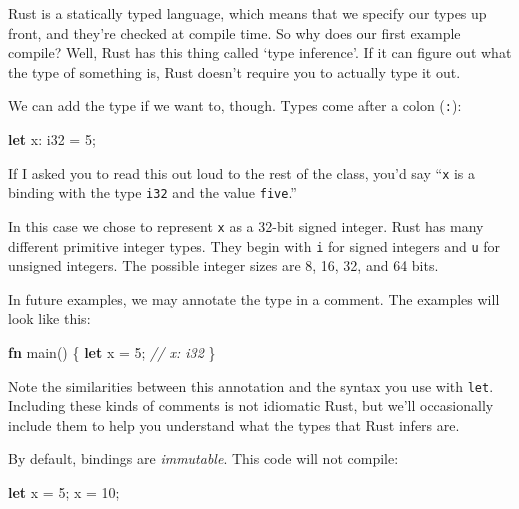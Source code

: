 \documentclass[a4paper,]{book}
\newenvironment{Shaded}{\begin{snugshade}}{\end{snugshade}}
\newcommand{\KeywordTok}[1]{\textcolor[rgb]{0.13,0.29,0.53}{\textbf{{#1}}}}
\newcommand{\DataTypeTok}[1]{\textcolor[rgb]{0.13,0.29,0.53}{{#1}}}
\newcommand{\DecValTok}[1]{\textcolor[rgb]{0.00,0.00,0.81}{{#1}}}
\newcommand{\CommentTok}[1]{\textcolor[rgb]{0.56,0.35,0.01}{\textit{{#1}}}}
\newcommand{\NormalTok}[1]{{#1}}
\begin{document}
Rust is a statically typed language, which means that we specify our
types up front, and they're checked at compile time. So why does our
first example compile? Well, Rust has this thing called `type
inference'. If it can figure out what the type of something is, Rust
doesn't require you to actually type it out.

We can add the type if we want to, though. Types come after a colon
(\texttt{:}):

\begin{Shaded}
\begin{Highlighting}[]
\KeywordTok{let} \NormalTok{x: }\DataTypeTok{i32} \NormalTok{= }\DecValTok{5}\NormalTok{;}
\end{Highlighting}
\end{Shaded}

If I asked you to read this out loud to the rest of the class, you'd say
``\texttt{x} is a binding with the type \texttt{i32} and the value
\texttt{five}.''

In this case we chose to represent \texttt{x} as a 32-bit signed
integer. Rust has many different primitive integer types. They begin
with \texttt{i} for signed integers and \texttt{u} for unsigned
integers. The possible integer sizes are 8, 16, 32, and 64 bits.

In future examples, we may annotate the type in a comment. The examples
will look like this:

\begin{Shaded}
\begin{Highlighting}[]
\KeywordTok{fn} \NormalTok{main() \{}
    \KeywordTok{let} \NormalTok{x = }\DecValTok{5}\NormalTok{; }\CommentTok{// x: i32}
\NormalTok{\}}
\end{Highlighting}
\end{Shaded}

Note the similarities between this annotation and the syntax you use
with \texttt{let}. Including these kinds of comments is not idiomatic
Rust, but we'll occasionally include them to help you understand what
the types that Rust infers are.

By default, bindings are \emph{immutable}. This code will not compile:

\begin{Shaded}
\begin{Highlighting}[]
\KeywordTok{let} \NormalTok{x = }\DecValTok{5}\NormalTok{;}
\NormalTok{x = }\DecValTok{10}\NormalTok{;}
\end{Highlighting}
\end{Shaded}
\end{document}

